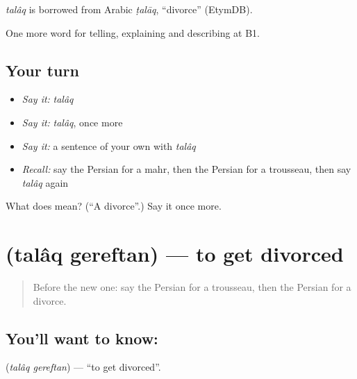 \begin{cousinweb}
\emph{talâq} is borrowed from Arabic \emph{ṭalāq}, \textquotedblleft{}divorce\textquotedblright{} (EtymDB).
\end{cousinweb}

\begin{grammarlens}[title={What you've built}]
One more word for telling, explaining and describing at B1.
\end{grammarlens}

\subsection*{Your turn}
\begin{itemize}
\raggedright
  \item \emph{Say it:} \emph{talâq}
  \item \emph{Say it:} \emph{talâq}, once more
  \item \emph{Say it:} a sentence of your own with \emph{talâq}
  \item \emph{Recall:} say the Persian for a mahr, then the Persian for a trousseau, then say \emph{talâq} again
\end{itemize}

\begin{tcolorbox}[breakable,colback=teal!4,colframe=teal!35!black,title={Before you move on}]
What does  mean? (\textquotedblleft{}A divorce\textquotedblright{}.) Say it once more.
\end{tcolorbox}
\section[\texorpdfstring{\fa{طلاق} \fa{گرفتن} (talâq gereftan)}{طلاق گرفتن (talâq gereftan)}]{  (talâq gereftan) — to get divorced}

\label{lesson:FA-C336-talaq-gereftan}



\begin{quote}
Before the new one: say the Persian for a trousseau, then the Persian for a divorce.
\end{quote}

\subsection*{You'll want to know:  }
\textbf{ } (\emph{talâq gereftan}) — \textquotedblleft{}to get divorced\textquotedblright{}.

